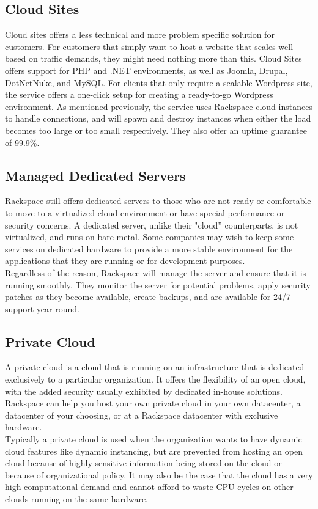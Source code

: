 \documentclass[DIV=calc, paper=letter, fontsize=12pt, twocolumn]{scrartcl}	 %
\begin{document}
\subsection*{Cloud Sites}

Cloud sites offers a less technical and more problem specific solution for customers.
For customers that simply want to host a website that scales well based on
traffic demands, they might need nothing more than this. Cloud Sites offers
support for PHP and .NET environments, as well as Joomla, Drupal, DotNetNuke,
and MySQL. For clients that only require a scalable Wordpress site, the service
offers a one-click setup for creating a ready-to-go Wordpress environment. As 
mentioned previously, the service uses Rackspace cloud instances to handle 
connections, and will spawn and destroy instances when either the load becomes
too large or too small respectively. They also offer an uptime guarantee of 
99.9\%.

\subsection*{Managed Dedicated Servers}

Rackspace still offers dedicated servers to those who are not ready or comfortable
to move to a virtualized cloud environment or have special performance or security
concerns. A dedicated server, unlike their "cloud'' counterparts, is not virtualized,
and runs on bare metal. Some companies may wish to keep some services on dedicated
hardware to provide a more stable environment for the applications that they
are running or for development purposes.
\\
Regardless of the reason, Rackspace will manage the server and ensure that it is 
running smoothly. They monitor the server for potential problems, apply security
patches as they become available, create backups, and are available for 24/7
support year-round.

\subsection*{Private Cloud}

A private cloud is a cloud that is running on an infrastructure that is dedicated
exclusively to a particular organization. It offers the flexibility of an
open cloud, with the added security usually exhibited by dedicated in-house
solutions. Rackspace can help you host your own private cloud in your own datacenter,
a datacenter of your choosing, or at a Rackspace datacenter with exclusive hardware.
\\
Typically a private cloud is used when the organization wants to have dynamic
cloud features like dynamic instancing, but are prevented from hosting an open
cloud because of highly sensitive information being stored on the cloud or
because of organizational policy. It may also be the case that the cloud has
a very high computational demand and cannot afford to waste CPU cycles on
other clouds running on the same hardware.
\end{document}
